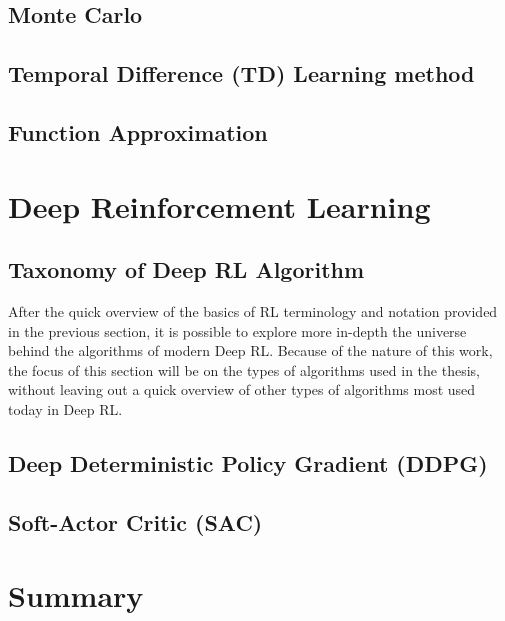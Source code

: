 \subsection{Monte Carlo}

\subsection{Temporal Difference (TD) Learning method}

\subsection{Function Approximation}

\section{Deep Reinforcement Learning}

\subsection{Taxonomy of Deep RL Algorithm}

After the quick overview of the basics of RL terminology and notation provided in the previous section, it is possible to explore more in-depth the universe behind the algorithms of modern Deep RL. Because of the nature of this work, the focus of this section will be on the types of algorithms used in the thesis, without leaving out a quick overview of other types of algorithms most used today in Deep RL.

\subsection{Deep Deterministic Policy Gradient (DDPG)}

\subsection{Soft-Actor Critic (SAC)}

\section{Summary}







